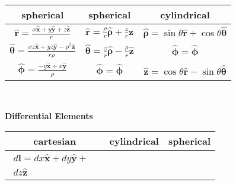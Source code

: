 \documentclass[letterpaper,landscape,10pt]{article}
\begin{document}
{\begin{multicols}{3}
\begin{center}
\begin{tabular}{ @{}c@{} !{\color{black}\vline} c !{\color{black}\vline} @{}c@{} }
		\hline
		\textbf{spherical}      & \textbf{spherical} & \textbf{cylindrical} \\
		\hline

		$ \bm{\hat{r}} = \frac{x\bm{\hat{x}} + y\bm{\hat{y}} +
			z\bm{\hat{z}}}{r} $ &
		$ \bm{\hat{r}} = \frac{\rho}{r}\bm{\hat{\rho}} + 
			\frac{z}{r}\bm{\hat{z}} $ &
		$ \bm{\hat{\rho}} = \sin\theta\bm{\hat{r}} +
			\cos\theta\bm{\hat{\theta}} $ \\

		$ \bm{\hat{\theta}} = \frac{xz\bm{\hat{x}} + yz\bm{\hat{y}} -
			\rho^2\bm{\hat{z}}} {r\rho} $ &
		$ \bm{\hat{\theta}} = \frac{z}{r}\bm{\hat{\rho}} -
			\frac{\rho}{r}\bm{\hat{z}} $ &
		$ \bm{\hat{\phi}} = \bm{\hat{\phi}} $ \\

		$ \bm{\hat{\phi}} = \frac{-y\bm{\hat{x}} + x\bm{\hat{y}}}{\rho} $ &
		$ \bm{\hat{\phi}} = \bm{\hat{\phi}} $ &
		$ \bm{\hat{z}} = \cos\theta\bm{\hat{r}} - \sin\theta\bm{\hat{\theta}}$\\
		
	\end{tabular}\\
	\end{center}
	
	\begin{center}
		\textbf{Differential Elements}\\
		\vspace{2.5pt}
		\begin{tabular}{ @{}c@{} !{\color{black}\vline} c !{\color{black}\vline} @{}c@{} }
			\textbf{cartesian} & \textbf{cylindrical} & \textbf{spherical} \\

			\hline

			\parbox[t]{.290\columnwidth}{\vspace{-10pt}
				\begin{equation*}\begin{split}
					d\bm{\bm{l}} = dx\bm{\hat{x}} + dy\bm{\hat{y}} +& \\
						dz\bm{\hat{z}}
				\end{split}\end{equation*} } &


\end{tabular}
\end{center}
\end{multicols}}
\end{document}
